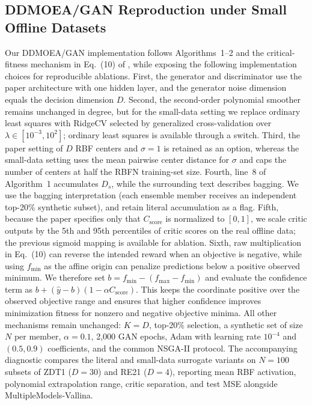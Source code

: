 \documentclass{article}
\begin{document}
\subsection{DDMOEA/GAN Reproduction under Small Offline Datasets}
Our DDMOEA/GAN implementation follows Algorithms~1--2 and the critical-fitness mechanism in Eq.~(10) of \citet{ddea_gan}, while exposing the following implementation choices for reproducible ablations. First, the generator and discriminator use the paper architecture with one hidden layer, and the generator noise dimension equals the decision dimension $D$. Second, the second-order polynomial smoother remains unchanged in degree, but for the small-data setting we replace ordinary least squares with RidgeCV selected by generalized cross-validation over $\lambda\in[10^{-3},10^2]$; ordinary least squares is available through a switch. Third, the paper setting of $D$ RBF centers and $\sigma=1$ is retained as an option, whereas the small-data setting uses the mean pairwise center distance for $\sigma$ and caps the number of centers at half the RBFN training-set size. Fourth, line~8 of Algorithm~1 accumulates $D_s$, while the surrounding text describes bagging. We use the bagging interpretation (each ensemble member receives an independent top-20\% synthetic subset), and retain literal accumulation as a flag. Fifth, because the paper specifies only that $C_{\mathrm{score}}$ is normalized to $[0,1]$, we scale critic outputs by the 5th and 95th percentiles of critic scores on the real offline data; the previous sigmoid mapping is available for ablation. Sixth, raw multiplication in Eq.~(10) can reverse the intended reward when an objective is negative, while using $f_{\min}$ as the affine origin can penalize predictions below a positive observed minimum. We therefore set $b=f_{\min}-(f_{\max}-f_{\min})$ and evaluate the confidence term as $b+(\hat y-b)(1-\alpha C_{\mathrm{score}})$. This keeps the coordinate positive over the observed objective range and ensures that higher confidence improves minimization fitness for nonzero and negative objective minima. All other mechanisms remain unchanged: $K=D$, top-20\% selection, a synthetic set of size $N$ per member, $\alpha=0.1$, 2,000 GAN epochs, Adam with learning rate $10^{-4}$ and $(0.5,0.9)$ coefficients, and the common NSGA-II protocol. The accompanying diagnostic compares the literal and small-data surrogate variants on $N=100$ subsets of ZDT1 ($D=30$) and RE21 ($D=4$), reporting mean RBF activation, polynomial extrapolation range, critic separation, and test MSE alongside MultipleModels-Vallina.
\end{document}
